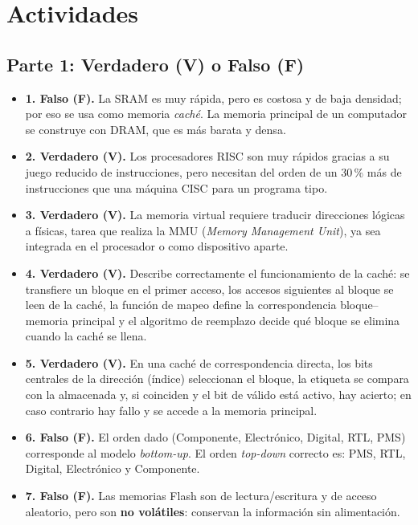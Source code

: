 \documentclass[10pt]{article}
\begin{document}
\section{Actividades}

\subsection{Parte 1: Verdadero (V) o Falso (F)}

\begin{itemize}
  \item \textbf{1. Falso (F).} La SRAM es muy rápida, pero es costosa y de baja densidad; por eso se usa como memoria \emph{caché}. La memoria principal de un computador se construye con DRAM, que es más barata y densa.

  \item \textbf{2. Verdadero (V).} Los procesadores RISC son muy rápidos gracias a su juego reducido de instrucciones, pero necesitan del orden de un 30\,\% más de instrucciones que una máquina CISC para un programa tipo.

  \item \textbf{3. Verdadero (V).} La memoria virtual requiere traducir direcciones lógicas a físicas, tarea que realiza la MMU (\emph{Memory Management Unit}), ya sea integrada en el procesador o como dispositivo aparte.

  \item \textbf{4. Verdadero (V).} Describe correctamente el funcionamiento de la caché: se transfiere un bloque en el primer acceso, los accesos siguientes al bloque se leen de la caché, la función de mapeo define la correspondencia bloque--memoria principal y el algoritmo de reemplazo decide qué bloque se elimina cuando la caché se llena.

  \item \textbf{5. Verdadero (V).} En una caché de correspondencia directa, los bits centrales de la dirección (índice) seleccionan el bloque, la etiqueta se compara con la almacenada y, si coinciden y el bit de válido está activo, hay acierto; en caso contrario hay fallo y se accede a la memoria principal.

  \item \textbf{6. Falso (F).} El orden dado (Componente, Electrónico, Digital, RTL, PMS) corresponde al modelo \emph{bottom-up}. El orden \emph{top-down} correcto es: PMS, RTL, Digital, Electrónico y Componente.

  \item \textbf{7. Falso (F).} Las memorias Flash son de lectura/escritura y de acceso aleatorio, pero son \textbf{no volátiles}: conservan la información sin alimentación.


\end{itemize}
\end{document}
